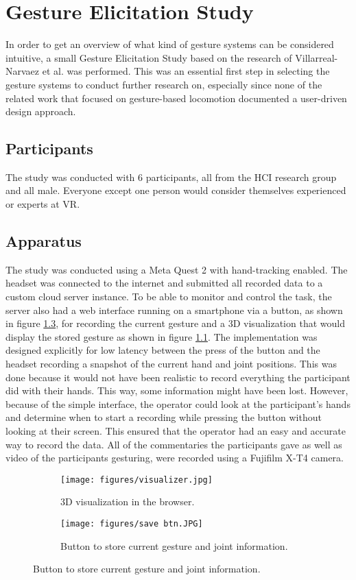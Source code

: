 \chapter{Gesture Elicitation Study}
In order to get an overview of what kind of gesture systems can be considered intuitive, a small Gesture Elicitation Study based on the research of Villarreal-Narvaez et al. \cite{elicitation} was performed. This was an essential first step in selecting the gesture systems to conduct further research on, especially since none of the related work that focused on gesture-based locomotion documented a user-driven design approach.

\section{Participants}
The study was conducted with 6 participants, all from the HCI research group and all male. Everyone except one person would consider themselves experienced or experts at VR.

\section{Apparatus}
The study was conducted using a Meta Quest 2 with hand-tracking enabled. The headset was connected to the internet and submitted all recorded data to a custom cloud server instance. To be able to monitor and control the task, the server also had a web interface running on a smartphone via a button, as shown in figure \ref{fig:savebtn}, for recording the current gesture and a 3D visualization that would display the stored gesture as shown in figure \ref{fig:vis2}. The implementation was designed explicitly for low latency between the press of the button and the headset recording a snapshot of the current hand and joint positions. This was done because it would not have been realistic to record everything the participant did with their hands. This way, some information might have been lost. However, because of the simple interface, the operator could look at the participant's hands and determine when to start a recording while pressing the button without looking at their screen. This ensured that the operator had an easy and accurate way to record the data. All of the commentaries the participants gave as well as video of the participants gesturing, were recorded using a Fujifilm X-T4 camera. 

\begin{figure}[!htb]
    \begin{subfigure}{0.5\textwidth}
  \centering
        \texttt{[image: figures/visualizer.jpg]}
        \caption{3D visualization in the browser.}
        \label{fig:vis2}
    \end{subfigure}%
    \begin{subfigure}{0.5\textwidth}
  \centering
        \texttt{[image: figures/save btn.JPG]}
        \caption{Button to store current gesture and joint information.}
        \label{fig:savebtn}
    \end{subfigure}%
\end{figure}

